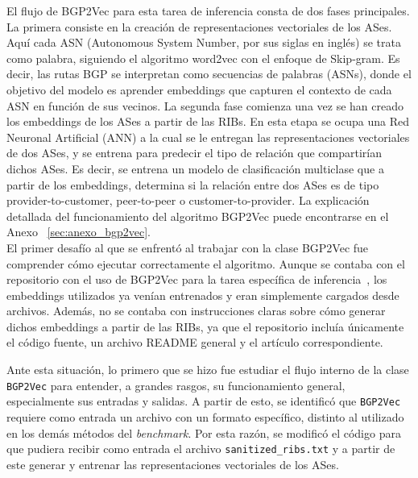 El flujo de BGP2Vec para esta tarea de inferencia consta de dos fases principales. La primera consiste en la creación de representaciones vectoriales de los ASes. Aquí cada ASN (Autonomous System Number, por sus siglas en inglés) se trata como palabra, siguiendo el algoritmo word2vec con el enfoque de Skip-gram. Es decir, las rutas BGP se interpretan como secuencias de palabras (ASNs), donde el objetivo del modelo es aprender embeddings que capturen el contexto de cada ASN en función de sus vecinos. 
La segunda fase comienza una vez se han creado los embeddings de los ASes a partir de las RIBs. En esta etapa se ocupa una Red Neuronal Artificial (ANN) a la cual se le entregan las representaciones vectoriales de dos ASes, y se entrena para predecir el tipo de relación que compartirían dichos ASes. Es decir, se entrena un modelo de clasificación multiclase que a partir de los embeddings, determina si la relación entre dos ASes es de tipo provider-to-customer, peer-to-peer o customer-to-provider. 
La explicación detallada del funcionamiento del algoritmo BGP2Vec puede encontrarse en el Anexo ~\ref{sec:anexo_bgp2vec}.\\


El primer desafío al que se enfrentó al trabajar con la clase BGP2Vec fue comprender cómo ejecutar correctamente el algoritmo.
Aunque se contaba con el repositorio con el uso de BGP2Vec para la tarea específica de inferencia~\cite{BGP2VecCode}, los embeddings utilizados ya venían entrenados y eran simplemente cargados desde archivos. Además, no se contaba con instrucciones claras sobre cómo generar dichos embeddings a partir de las RIBs, ya que el repositorio incluía únicamente el código fuente, un archivo README general y el artículo correspondiente.

Ante esta situación, lo primero que se hizo fue estudiar el flujo interno de la clase \texttt{BGP2Vec} para entender, a grandes rasgos, su funcionamiento general, especialmente sus entradas y salidas. A partir de esto, se identificó que \texttt{BGP2Vec} requiere como entrada un archivo con un formato específico, distinto al utilizado en los demás métodos del \textit{benchmark}. Por esta razón, se modificó el código para que pudiera recibir como entrada el archivo \texttt{sanitized\_ribs.txt} y a partir de este generar y entrenar las representaciones vectoriales de los ASes.\\

